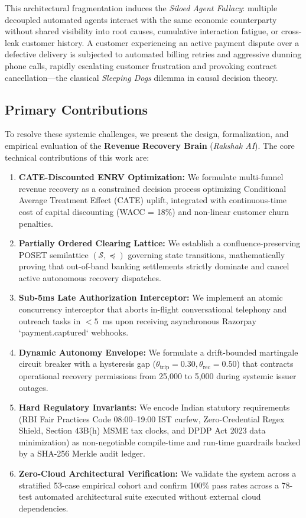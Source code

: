 \documentclass[10pt, twocolumn, a4paper]{article}
\newcommand{\INR}{\text{INR~}}
\begin{document}
This architectural fragmentation induces the \textit{Siloed Agent Fallacy}: multiple decoupled automated agents interact with the same economic counterparty without shared visibility into root causes, cumulative interaction fatigue, or cross-leak customer history. A customer experiencing an active payment dispute over a defective delivery is subjected to automated billing retries and aggressive dunning phone calls, rapidly escalating customer frustration and provoking contract cancellation---the classical \textit{Sleeping Dogs} dilemma in causal decision theory.

\subsection{Primary Contributions}
To resolve these systemic challenges, we present the design, formalization, and empirical evaluation of the \textbf{Revenue Recovery Brain} (\textit{Rakshak AI}). The core technical contributions of this work are:

\begin{enumerate}[leftmargin=*]
  \item \textbf{CATE-Discounted ENRV Optimization:} We formulate multi-funnel revenue recovery as a constrained decision process optimizing Conditional Average Treatment Effect (CATE) uplift, integrated with continuous-time cost of capital discounting (WACC = 18\%) and non-linear customer churn penalties.
  
  \item \textbf{Partially Ordered Clearing Lattice:} We establish a confluence-preserving POSET semilattice $(\mathcal{S}, \preceq)$ governing state transitions, mathematically proving that out-of-band banking settlements strictly dominate and cancel active autonomous recovery dispatches.
  
  \item \textbf{Sub-5ms Late Authorization Interceptor:} We implement an atomic concurrency interceptor that aborts in-flight conversational telephony and outreach tasks in $<5$~ms upon receiving asynchronous Razorpay `payment.captured` webhooks.
  
  \item \textbf{Dynamic Autonomy Envelope:} We formulate a drift-bounded martingale circuit breaker with a hysteresis gap ($\theta_{\text{trip}} = 0.30, \theta_{\text{rec}} = 0.50$) that contracts operational recovery permissions from \INR 25,000 to \INR 5,000 during systemic issuer outages.
  
  \item \textbf{Hard Regulatory Invariants:} We encode Indian statutory requirements (RBI Fair Practices Code 08:00--19:00 IST curfew, Zero-Credential Regex Shield, Section 43B(h) MSME tax clocks, and DPDP Act 2023 data minimization) as non-negotiable compile-time and run-time guardrails backed by a SHA-256 Merkle audit ledger.
  
  \item \textbf{Zero-Cloud Architectural Verification:} We validate the system across a stratified 53-case empirical cohort and confirm 100\% pass rates across a 78-test automated architectural suite executed without external cloud dependencies.
\end{enumerate}
\end{document}
